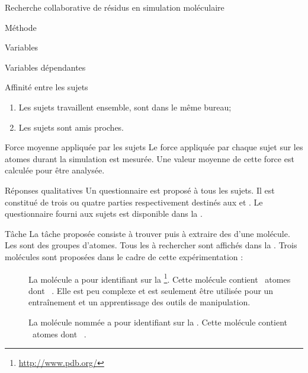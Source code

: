 \documentclass[myfrancais]{mythesis}
\begin{document}
\begin{mychapter}{Recherche collaborative de résidus en simulation moléculaire}
\begin{mysection}{Méthode}
\begin{mysubsection}{Variables}
\begin{mysubsubsection}{Variables dépendantes}
\begin{myparagraph}{ Affinité entre les sujets}
\begin{enumerate}
							\item Les sujets travaillent ensemble, sont dans le même bureau;
							\item Les sujets sont amis proches.
						\end{enumerate}
					\end{myparagraph}
					\begin{myparagraph}{ Force moyenne appliquée par les sujets}
						Le force appliquée par chaque sujet sur les atomes durant la simulation est mesurée.
						Une valeur moyenne de cette force est calculée pour être analysée.
					\end{myparagraph}
					\begin{myparagraph}{ Réponses qualitatives}
						Un questionnaire est proposé à tous les sujets.
						Il est constitué de trois ou quatre parties respectivement destinés aux  et .
						Le questionnaire fourni aux sujets est disponible dans la .
					\end{myparagraph}
				\end{mysubsubsection}
			\end{mysubsection}
			\begin{mysubsection}[sse-exp1-Tache]{Tâche}
				La tâche proposée consiste à trouver puis à extraire des  d'une molécule.
				Les  sont des groupes d'atomes.
				Tous les  à rechercher sont affichés dans la .
				Trois molécules sont proposées dans le cadre de cette expérimentation :
				\begin{description}
					\item[\myTRPZIPPER]
						La molécule \myTRPZIPPER {} a pour identifiant \myPDB {} sur la \myPDBbase\footnote{\url{http://www.pdb.org/}}.
						Cette molécule contient ~atomes dont ~.
						Elle est peu complexe et est seulement être utilisée pour un entraînement et un apprentissage des outils de manipulation.
					\item[\myTRPCAGE]
						La molécule nommée \myTRPCAGE {} a pour identifiant \myPDB {} sur la \myPDBbase\footnotemark[\value{footnote}].
						Cette molécule contient ~atomes dont ~.

\end{description}
\end{mysubsection}
\end{mysection}
\end{mychapter}
\end{document}
